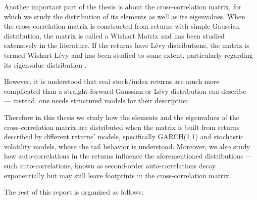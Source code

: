 \documentclass{report}
\begin{document}


Another important part of the thesis is about the cross-correlation
matrix, for which we study the distribution of its elements as well
as its eigenvalues. When the cross-correlation matrix is constructed
from returns with simple Gaussian distribution, the matrix is called a
Wishart Matrix and has been studied extensively in the literature. If
the returns have L\'evy distributions, the matrix is termed
Wishart-L\'evy and has been studied to some extent, particularly
regarding its eigenvalue distribution \cite{politi2010}.

However, it is understood that real stock/index returns are much more
complicated than a straight-forward Gaussian or L\'evy distribution can
describe --- instead, one needs structured models for their description.

Therefore in this thesis we study how the elements and the eigenvalues
of the cross-correlation matrix are distributed when the matrix is
built from returns described by different returns' models, specifically
GARCH(1,1) and stochastic volatility models, whose the tail behavior is
understood. Moreover, we also study how auto-correlations in the
returns influence the aforementioned distributions --- such
auto-correlations, known as second-order auto-correlations decay
exponentially but may still leave footprints in the cross-correlation
matrix.

The rest of this report is organized as follows:

\end{document}
